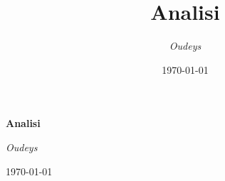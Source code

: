 \documentclass[a4paper,12pt]{report}
\title{\textbf{Analisi}}
\author{\textit{Oudeys}}
\date{\today}
\theoremstyle{mystyle}
\begin{document}
\renewcommand{\contentsname}{Indice}


\begin{titlepage}
    \centering
    \vspace*{3cm}
    
    {\Huge\textbf{Analisi}\par}
    \vspace{0.5cm}
    {\Large\textit{Oudeys}\par}
    \vspace{1cm}
    {\large\today\par}

    \vfill
    
    \usetikzlibrary{decorations.shapes}
\begin{comment}
    \begin{tikzpicture}

        \foreach \i in {0,60,...,300} {
          \draw[fill=black] (\i:2.3cm) circle (1.6 cm);
        }
        
        
        \foreach \i in {30,90,...,330} {
          \draw[fill=black,thick, rotate=\i] (0,0)--(330:3.1cm) .. controls (345:4.3cm) and (355:3.8cm) .. (0:4.2cm) .. controls (5:3.8cm) and (15:4.3cm) .. (30:3.1cm)--cycle;
        
          \draw[fill=white,thick, rotate=\i] (0,0)--(330:2.9cm) .. controls (345:4.1cm) and (355:3.6cm) .. (0:4cm) .. controls (5:3.6cm) and (15:4.1cm) .. (30:2.9cm)--cycle;
        
          \draw[decorate, decoration={shape backgrounds,shape=circle,shape size=0.5mm,shape sep=1mm}, fill=black, rotate=\i] (330:2.7cm) .. controls (345:3.9cm) and (355:3.4cm) .. (0:3.8cm) .. controls (5:3.4cm) and (15:3.9cm) .. (30:2.7cm);
        }
        
        \foreach \i in {0,60,...,300} {
          \draw[fill=white] (\i:2.3cm) circle (1.45 cm);
          \foreach \j in {0,3,6,...,357} {
            \draw[] (\i:2.3cm) -- +(\j:1.45cm);
          }
          \draw[ultra thick, fill=white] (\i:2.3cm) circle (1.25 cm);
        }
        
        \foreach \i in {0,60,...,300} {
          \foreach \j in {10,50,...,350}{
            \draw[fill=white,rotate around={\j:(\i:2.5)}] (\i:2.5) ellipse (0.9cm and 0.1cm);
          }
          \foreach \j in {0,40,...,320}{
            \draw[fill=white,rotate around={\j:(\i:2.5)}] (\i:2.5) ellipse (0.9cm and 0.1cm);
          }
           \draw[fill=black] (\i-30:2.8cm) circle (0.2 cm);
        }
        

\end{comment}
\end{titlepage}
\end{document}

